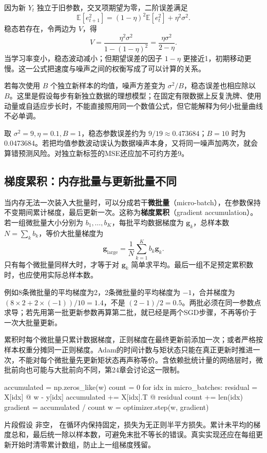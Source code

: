 \documentclass[UTF8,fontset=none,zihao=-4,a4paper]{ctexart}
\newcommand{\term}[1]{\textbf{#1}}
\newcommand{\code}[1]{\texttt{\detokenize{#1}}}
\numberwithin{equation}{section}
\numberwithin{figure}{section}
\begin{document}
因为新 $Y_t$ 独立于旧参数，交叉项期望为零，二阶误差满足
\[
 \mathbb E[e_{t+1}^2]=(1-\eta)^2\mathbb E[e_t^2]+\eta^2\sigma^2.
\]
稳态若存在，令两边为 $V$，得
\begin{equation}
 V=\frac{\eta^2\sigma^2}{1-(1-\eta)^2}
 =\frac{\eta\sigma^2}{2-\eta}.
\end{equation}
当学习率变小，稳态波动减小；但期望误差的因子 $1-\eta$ 更接近1，初期移动更慢。这一公式把速度与噪声之间的权衡写成了可以计算的关系。

若每次使用 $B$ 个独立新样本的均值，噪声方差变为 $\sigma^2/B$，稳态误差也相应除以 $B$。这里是假设每步有新独立数据的理想模型；在固定有限数据上反复洗牌、使用动量或自适应步长时，不能直接照用同一个数值公式，但它能解释为何小批量曲线不必单调。

取 $\sigma^2=9,\eta=0.1,B=1$，稳态参数误差约为 $9/19\approx0.473684$；$B=10$ 时为0.0473684。若把均值参数波动误认为数据噪声本身，又将同一噪声加两次，就会算错预测风险。对独立新标签的MSE还应加不可约方差9。

\subsection{梯度累积：内存批量与更新批量不同}
当内存无法一次装入大批量时，可以分成若干\term{微批量}（micro-batch），在参数保持不变期间累计梯度，最后更新一次。这称为\term{梯度累积}（gradient accumulation）。若一组微批量大小分别为 $b_1,\ldots,b_K$，每批平均数据梯度为 $\symbf g_k$，总样本数 $N=\sum_kb_k$，等价大批量梯度为
\[
 \symbf g_{\mathrm{large}}=\frac1N\sum_{k=1}^K b_k\symbf g_k.
\]
只有每个微批量同样大时，才等于对 $\symbf g_k$ 简单求平均。最后一组不足预定累积数时，也应使用实际总样本数。

例如8条微批量的平均梯度为2，2条微批量的平均梯度为 $-1$，合并梯度为 $(8\times2+2\times(-1))/10=1.4$，不是 $(2-1)/2=0.5$。两批必须在同一参数点求导；若先用第一批更新参数再算第二批，就已经是两个SGD步骤，不再等价于一次大批量更新。

累积时每个微批量只累计数据梯度，正则梯度在最终更新前添加一次；或者严格按样本权重分摊同一正则梯度。Adam的时间计数与矩状态只能在真正更新时推进一次，不能对每个微批量先更新矩状态再声称等价。含依赖批统计量的网络层时，微批前向也可能与大批前向不同，第24章会讨论这一限制。

\begin{pycode}
accumulated = np.zeros_like(w)
count = 0
for idx in micro_batches:
    residual = X[idx] @ w - y[idx]
    accumulated += X[idx].T @ residual
    count += len(idx)
gradient = accumulated / count
w = optimizer.step(w, gradient)
\end{pycode}
片段假设 \code{micro_batches} 非空，\code{w} 在循环内保持固定，损失为无正则半平方损失。累计未平均的梯度总和，最后统一除以样本数，可避免末批不等长的错误。真实实现还应在每组更新开始时清零累计数组，防止上一组梯度残留。
\end{document}
